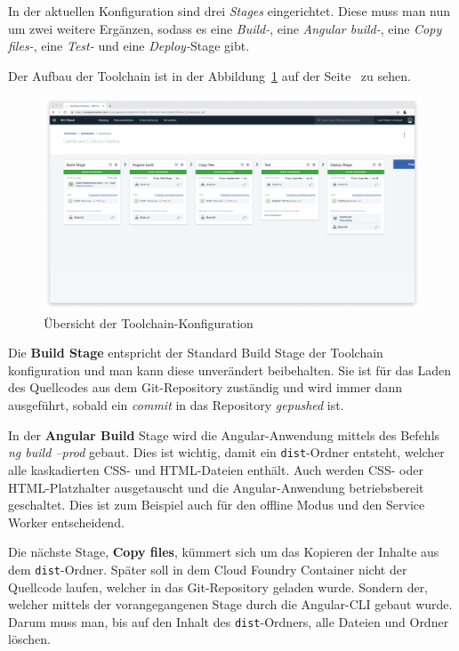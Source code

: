 In der aktuellen Konfiguration sind drei \textit{Stages} eingerichtet. Diese muss man nun um zwei weitere Ergänzen,
sodass es eine \textit{Build-}, eine \textit{Angular build-}, eine \textit{Copy files-}, eine \textit{Test-} und eine
\textit{Deploy-}Stage gibt.

Der Aufbau der Toolchain ist in der Abbildung~\ref{fig:umsetzung_toolchain_pipeline_frontend} auf der
Seite~\pageref{fig:umsetzung_toolchain_pipeline_frontend} zu sehen.

\begin{figure}[h]
    \centering
    \includegraphics[width=\textwidth]{images/kapitel_4/toolchain_pipeline.png}
    \caption{Übersicht der Toolchain-Konfiguration}
    \label{fig:umsetzung_toolchain_pipeline_frontend}
\end{figure}

Die \textbf{Build Stage} entspricht der Standard Build Stage der Toolchain konfiguration und man kann diese unverändert
beibehalten. Sie ist für das Laden des Quellcodes aus dem Git-Repository zuständig und wird immer dann ausgeführt,
sobald ein \textit{commit} in das Repository \textit{gepushed} ist.

In der \textbf{Angular Build} Stage wird die Angular-Anwendung mittels des Befehls \textit{ng build --prod} gebaut. Dies
ist wichtig, damit ein \texttt{dist}-Ordner entsteht, welcher alle kaskadierten CSS- und HTML-Dateien enthält. Auch
werden CSS- oder HTML-Platzhalter ausgetauscht und die Angular-Anwendung betriebsbereit geschaltet. Dies ist zum
Beispiel auch für den offline Modus und den Service Worker entscheidend.

Die nächste Stage, \textbf{Copy files}, kümmert sich um das Kopieren der Inhalte aus dem \texttt{dist}-Ordner. Später
soll in dem Cloud Foundry Container nicht der Quellcode laufen, welcher in das Git-Repository geladen wurde. Sondern
der, welcher mittels der vorangegangenen Stage durch die Angular-CLI gebaut wurde. Darum muss man, bis auf den Inhalt
des \texttt{dist}-Ordners, alle Dateien und Ordner löschen.

